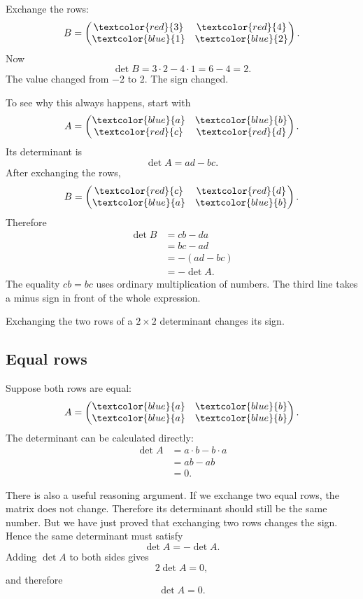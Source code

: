 Exchange the rows:
\[
B=
\begin{pmatrix}
\textcolor{red}{3}&\textcolor{red}{4}\\
\textcolor{blue}{1}&\textcolor{blue}{2}
\end{pmatrix}.
\]
Now
\[
\det B=3\cdot2-4\cdot1=6-4=2.
\]
The value changed from \(-2\) to \(2\). The sign changed.

To see why this always happens, start with
\[
A=
\begin{pmatrix}
\textcolor{blue}{a}&\textcolor{blue}{b}\\
\textcolor{red}{c}&\textcolor{red}{d}
\end{pmatrix}.
\]
Its determinant is
\[
\det A=ad-bc.
\]
After exchanging the rows,
\[
B=
\begin{pmatrix}
\textcolor{red}{c}&\textcolor{red}{d}\\
\textcolor{blue}{a}&\textcolor{blue}{b}
\end{pmatrix}.
\]
Therefore
\[
\begin{aligned}
\det B
&=cb-da\\
&=bc-ad\\
&=-(ad-bc)\\
&=-\det A.
\end{aligned}
\]
The equality \(cb=bc\) uses ordinary multiplication of numbers. The third line takes a minus sign in front of the whole expression.

\begin{theorembox}
Exchanging the two rows of a \(2\times2\) determinant changes its sign.
\end{theorembox}

\subsection{Equal rows}

Suppose both rows are equal:
\[
A=
\begin{pmatrix}
\textcolor{blue}{a}&\textcolor{blue}{b}\\
\textcolor{blue}{a}&\textcolor{blue}{b}
\end{pmatrix}.
\]
The determinant can be calculated directly:
\[
\begin{aligned}
\det A
&=a\cdot b-b\cdot a\\
&=ab-ab\\
&=0.
\end{aligned}
\]

There is also a useful reasoning argument. If we exchange two equal rows, the matrix does not change. Therefore its determinant should still be the same number. But we have just proved that exchanging two rows changes the sign. Hence the same determinant must satisfy
\[
\det A=-\det A.
\]
Adding \(\det A\) to both sides gives
\[
2\det A=0,
\]
and therefore
\[
\det A=0.
\]

